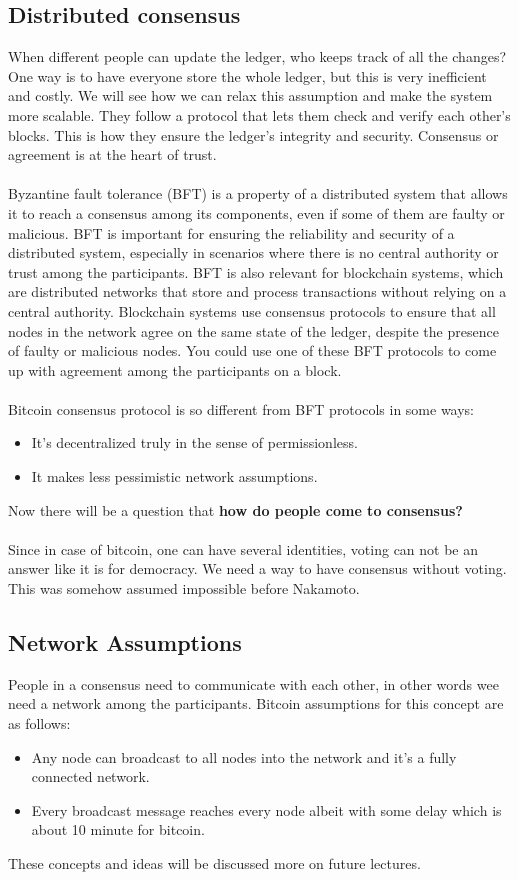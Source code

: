 \documentclass{report}
\begin{document}
\subsection{Distributed consensus}
 When different people can update the ledger, who keeps track of all the changes? One way is to have everyone store the whole ledger, but this is very inefficient and costly. We will see how we can relax this assumption and make the system more scalable. They follow a protocol that lets them check and verify each other’s blocks. This is how they ensure the ledger’s integrity and security. Consensus or agreement is at the heart of trust.\\\\
Byzantine fault tolerance (BFT) is a property of a distributed system that allows it to reach a consensus among its components, even if some of them are faulty or malicious. BFT is important for ensuring the reliability and security of a distributed system, especially in scenarios where there is no central authority or trust among the participants. BFT is also relevant for blockchain systems, which are distributed networks that store and process transactions without relying on a central authority. Blockchain systems use consensus protocols to ensure that all nodes in the network agree on the same state of the ledger, despite the presence of faulty or malicious nodes.  You could use one of these BFT protocols to come up with agreement among the participants on a block.\\\\
Bitcoin consensus protocol is so different from BFT protocols in some ways:
\begin{itemize}
	\item It's decentralized truly in the sense of permissionless.
	\item It makes less pessimistic network assumptions.
\end{itemize}
Now there will be a question that  \textbf{how do people come to consensus?}\\\\
Since in case of bitcoin, one can have several identities,  voting can not be an answer like it is for democracy. We  need a way to have consensus without voting. This was somehow assumed impossible before Nakamoto.
\subsection{Network Assumptions}
People in a consensus need to communicate with each other, in other words wee need a network among the participants.
Bitcoin assumptions for this concept are as follows:
\begin{itemize}
	\item Any node can broadcast to all nodes into the network and it's a fully connected network.
	\item Every broadcast message reaches every node albeit with some delay which is about 10 minute for bitcoin. 
\end{itemize}
These concepts and ideas will be discussed more on future lectures.
\end{document}
